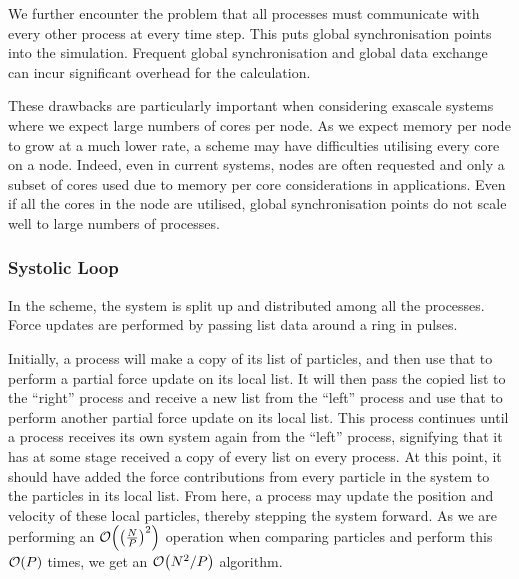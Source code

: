 We further encounter the problem that all processes must communicate
with every other process at every time step.
%
This puts global synchronisation points into the simulation.
%
Frequent global synchronisation and global data exchange can incur
significant overhead for the calculation.

%
These drawbacks are particularly important when considering exascale systems
where we expect large numbers of cores per node.
%
As we expect memory per node to grow at a much lower rate, a \replicateddata{}
scheme may have difficulties utilising every core on a node.
%
Indeed, even in current systems, nodes are often requested and only a
subset of cores used due to memory per core considerations in applications.
%
Even if all the cores in the node are utilised, global synchronisation
points do not scale well to large numbers of processes.



\subsubsection{Systolic Loop}
\label{sec:background:subsec:systolic_loop}

%
In the \systolicloop{} scheme, the system is split up and distributed among
all the processes.
%
Force updates are performed by passing list data around a ring in pulses.

Initially, a process will make a copy of its list of particles,
and then use that to perform a partial force update on its local list.
%
It will then pass the copied list to the ``right'' process and
receive a new list from the ``left'' process and use that to perform
another partial force update on its local list.
%
This process continues until a process receives its own system again from
the ``left'' process, signifying that it has at some stage received
a copy of every list on every process.
%
At this point, it should have added the force contributions from
every particle in the system to the particles in its local list.
%
From here, a process may update the position and velocity of these local
particles, thereby stepping the system forward.
%
As we are performing an $\mathcal{O}{\left({ \left(\frac{N}{P}\right)^2 }\right)}$ operation
when comparing particles and perform this $\mathcal{O}{\left({ P }\right)}$ times, we
get an $\mathcal{O}{\left({ N^2/P }\right)}$ algorithm.


